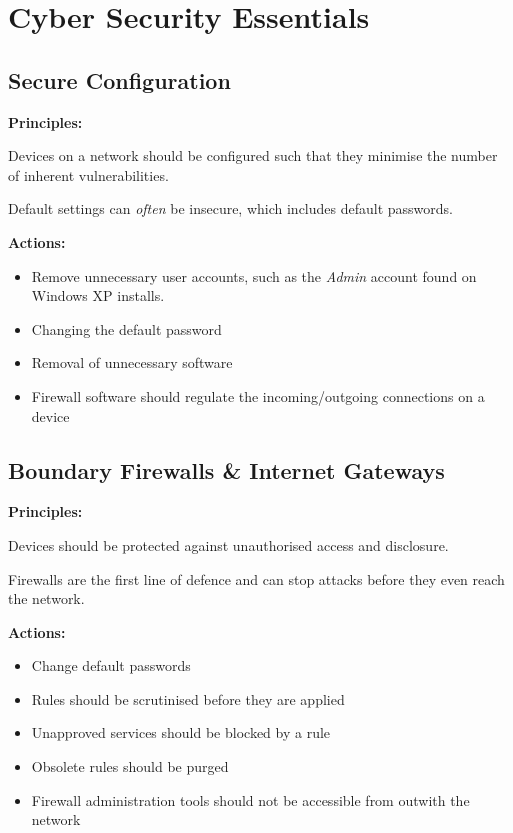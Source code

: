 \documentclass{article}
\begin{document}
\filbreak
\section{Cyber Security Essentials}

\subsection{Secure Configuration}

\textbf{Principles:}

Devices on a network should be configured such that they minimise the
number of inherent vulnerabilities.

Default settings can \textit{often} be insecure, which includes
default passwords.

\textbf{Actions:}

\begin{itemize}
\item
  Remove unnecessary user accounts, such as the \textit{Admin}
  account found on Windows XP installs.
\item
  Changing the default password
\item 
  Removal of unnecessary software
\item 
  Firewall software should regulate the incoming/outgoing connections on a device
\end{itemize}

\subsection{Boundary Firewalls \& Internet Gateways}

\textbf{Principles:}

Devices should be protected against unauthorised access and disclosure.

Firewalls are the first line of defence and can stop attacks before they even reach the network.

\textbf{Actions:}

\begin{itemize}
\item 
  Change default passwords
\item 
  Rules should be scrutinised before they are applied
\item 
  Unapproved services should be blocked by a rule
\item 
  Obsolete rules should be purged
\item 
  Firewall administration tools should not be accessible from outwith the network
\end{itemize}
\end{document}
